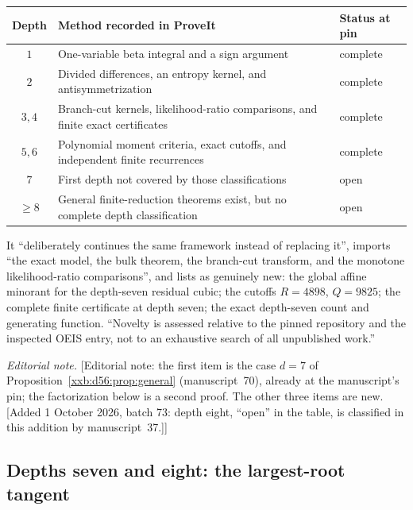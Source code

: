 \documentclass[11pt,a4paper]{article}
\numberwithin{equation}{section}
\theoremstyle{definition}
\theoremstyle{remark}
\theoremstyle{plain}
\begin{document}
\begin{center}
\small
\begin{tabular}{@{}c p{} p{}@{}}
\toprule
Depth & Method recorded in ProveIt & Status at pin\\
\midrule
$1$ & One-variable beta integral and a sign argument & complete\\
$2$ & Divided differences, an entropy kernel, and antisymmetrization & complete\\
$3,4$ & Branch-cut kernels, likelihood-ratio comparisons, and finite exact certificates & complete\\
$5,6$ & Polynomial moment criteria, exact cutoffs, and independent finite recurrences & complete\\
$7$ & First depth not covered by those classifications & open\\
$\geq8$ & General finite-reduction theorems exist, but no complete depth classification & open\\
\bottomrule
\end{tabular}
\end{center}
It ``deliberately continues the same framework instead of replacing it'',
imports ``the exact model, the bulk theorem, the branch-cut transform, and the
monotone likelihood-ratio comparisons'', and lists as genuinely new: the global
affine minorant for the depth-seven residual cubic; the cutoffs $R=4898$,
$Q=9825$; the complete finite certificate at depth seven; the exact
depth-seven count and generating function.  ``Novelty is assessed relative to
the pinned repository and the inspected OEIS entry, not to an exhaustive
search of all unpublished work.''

\emph{Editorial note.}  [Editorial note: the first item is the case $d=7$ of
Proposition~\ref{xxb:d56:prop:general} (manuscript~70), already at the
manuscript's pin; the factorization below is a second proof.  The other three
items are new.  [Added 1 October 2026, batch 73: depth eight, ``open'' in the
table, is classified in this addition by manuscript~37.]]

\subsection{Depths seven and eight: the largest-root tangent}\label{xxb:d78:sec:tangent}
\end{document}
